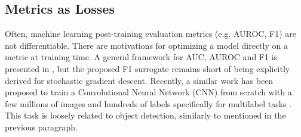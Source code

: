 \subsection{Metrics as Losses}

Often, machine learning post-training evaluation metrics (e.g. AUROC, F1) are
not differentiable. There are motivations  for
optimizing a model directly on a metric at training time. A general framework
for AUC, AUROC and F1 is presented in \cite{optimizableLosses}, but the
proposed F1 surrogate remains short of being explicitly derived for stochastic
gradient descent. Recently, a similar work has been proposed to train a
Convolutional Neural Network (CNN) from scratch with a few millions of images
and hundreds of labels specifically for multilabel tasks \cite{tencent}. This
task is loosely related to object detection, similarly to
\cite{multitaskLabelImages} mentioned in the previous paragraph.






